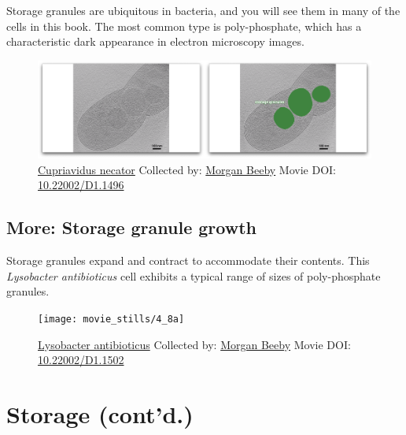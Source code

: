 \documentclass[]{tufte-book}
\begin{document}
Storage granules are ubiquitous in bacteria, and you will see them in
many of the cells in this book. The most common type is poly-phosphate,
which has a characteristic dark appearance in electron microscopy
images.





\begin{figure}
\includegraphics{movie_stills/4_8} \caption[\protect\hyperlink{tree}{Cupriavidus necator} Collected by:
\protect\hyperlink{morgan_beeby}{Morgan Beeby} Movie DOI:
\href{https://doi.org/10.22002/D1.1496}{10.22002/D1.1496}]{\protect\hyperlink{tree}{Cupriavidus necator} Collected by:
\protect\hyperlink{morgan_beeby}{Morgan Beeby} Movie DOI:
\href{https://doi.org/10.22002/D1.1496}{10.22002/D1.1496}}\label{fig:4-8}
\end{figure}

\hypertarget{Storage_granule_growth}{\subsection*{More: Storage granule
growth}\label{Storage_granule_growth}}

Storage granules expand and contract to accommodate their contents. This
\emph{Lysobacter antibioticus} cell exhibits a typical range of sizes of
poly-phosphate granules.





\begin{figure}
\texttt{[image: movie\_stills/4\_8a]} \caption[\protect\hyperlink{tree}{Lysobacter antibioticus} Collected
by: \protect\hyperlink{morgan_beeby}{Morgan Beeby} Movie DOI:
\href{https://doi.org/10.22002/D1.1502}{10.22002/D1.1502}]{\protect\hyperlink{tree}{Lysobacter antibioticus} Collected
by: \protect\hyperlink{morgan_beeby}{Morgan Beeby} Movie DOI:
\href{https://doi.org/10.22002/D1.1502}{10.22002/D1.1502}}\label{fig:4-8a}
\end{figure}

\section{Storage (cont'd.)}\label{storage-contd.}
\end{document}
